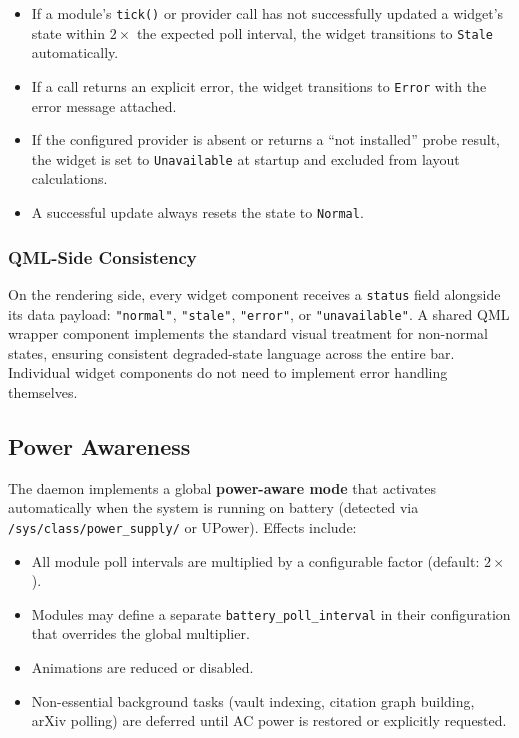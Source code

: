 \documentclass[11pt,a4paper]{article}
\begin{document}
\begin{itemize}[leftmargin=1.5em, itemsep=2pt]
  \item If a module's \texttt{tick()} or provider call has not successfully updated a widget's state within $2\times$ the expected poll interval, the widget transitions to \texttt{Stale} automatically.
  \item If a call returns an explicit error, the widget transitions to \texttt{Error} with the error message attached.
  \item If the configured provider is absent or returns a ``not installed'' probe result, the widget is set to \texttt{Unavailable} at startup and excluded from layout calculations.
  \item A successful update always resets the state to \texttt{Normal}.
\end{itemize}

\subsubsection{QML-Side Consistency}

On the rendering side, every widget component receives a \texttt{status} field alongside its data payload: \texttt{"normal"}, \texttt{"stale"}, \texttt{"error"}, or \texttt{"unavailable"}. A shared QML wrapper component implements the standard visual treatment for non-normal states, ensuring consistent degraded-state language across the entire bar. Individual widget components do not need to implement error handling themselves.


\subsection{Power Awareness}
\label{sec:power-awareness}

The daemon implements a global \textbf{power-aware mode} that activates automatically when the system is running on battery (detected via \texttt{/sys/class/power\_supply/} or UPower). Effects include:

\begin{itemize}[leftmargin=1.5em, itemsep=2pt]
  \item All module poll intervals are multiplied by a configurable factor (default: $2\times$).
  \item Modules may define a separate \texttt{battery\_poll\_interval} in their configuration that overrides the global multiplier.
  \item Animations are reduced or disabled.
  \item Non-essential background tasks (vault indexing, citation graph building, arXiv polling) are deferred until AC power is restored or explicitly requested.
\end{itemize}
\end{document}
